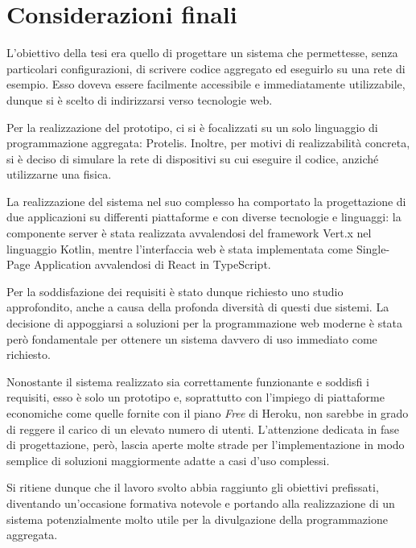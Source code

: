 \chapter{Considerazioni finali}\label{ch:considerations}
  L'obiettivo della tesi era quello di progettare un sistema che permettesse, senza particolari configurazioni,
  di scrivere codice aggregato ed eseguirlo su una rete di esempio.
  Esso doveva essere facilmente accessibile e immediatamente utilizzabile, dunque si è scelto di indirizzarsi verso tecnologie web.

  Per la realizzazione del prototipo, ci si è focalizzati su un solo linguaggio di programmazione aggregata: Protelis.
  Inoltre, per motivi di realizzabilità concreta, si è deciso di simulare la rete di dispositivi su cui eseguire il codice,
  anziché utilizzarne una fisica.

  La realizzazione del sistema nel suo complesso ha comportato la progettazione di due applicazioni su differenti piattaforme e con diverse tecnologie e linguaggi:
  la componente server è stata realizzata avvalendosi del framework Vert.x nel linguaggio Kotlin,
  mentre l'interfaccia web è stata implementata come Single-Page Application avvalendosi di React in TypeScript.

  Per la soddisfazione dei requisiti è stato dunque richiesto uno studio approfondito, anche a causa della profonda diversità di questi due sistemi.
  La decisione di appoggiarsi a soluzioni per la programmazione web moderne è stata però fondamentale per ottenere un sistema davvero di uso immediato come richiesto.

  Nonostante il sistema realizzato sia correttamente funzionante e soddisfi i requisiti, esso è solo un prototipo e, soprattutto con l'impiego di piattaforme economiche come quelle fornite con il piano \emph{Free} di Heroku, non sarebbe in grado di reggere il carico di un elevato numero di utenti.
  L'attenzione dedicata in fase di progettazione, però, lascia aperte molte strade per l'implementazione in modo semplice di soluzioni maggiormente adatte a casi d'uso complessi.

  Si ritiene dunque che il lavoro svolto abbia raggiunto gli obiettivi prefissati, diventando un'occasione formativa notevole e portando alla realizzazione di un sistema potenzialmente molto utile per la divulgazione della programmazione aggregata.
